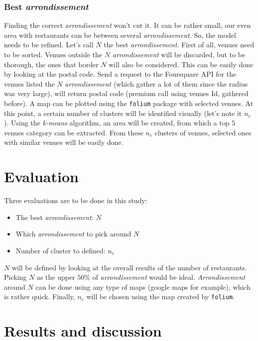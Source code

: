 \documentclass[english]{article}
\begin{document}
	\subsubsection{Best \textit{arrondissement}}
	Finding the correct \textit{arrondissement} won't cut it. It can be rather small, our even area with restaurants can be between several \textit{arrondissement}. So, the model needs to be refined. Let's call $N$ the best \textit{arrondissement}. First of all, venues need to be sorted. Venues outside the $N$ \textit{arrondissement} will be discarded, but to be thorough, the ones that border $N$ will also be considered. This can be easily done by looking at the postal code. Send a request to the Foursquare API for the venues listed the $N$ \textit{arrondissement} (which gather a lot of them since the radius was very large), will return postal code (premium call using venues Id, gathered before). A map can be plotted using the \texttt{folium} package with selected venues. At this point, a certain number of clusters will be identified visually (let's note it $n_c$). Using the \textit{k-means} algorithm, an area will be created, from which a top $5$ venues category can be extracted. From these $n_c$ clusters of venues, selected ones with similar venues will be easily done.
	\section{Evaluation}
	Three evaluations are to be done in this study:
	\begin{itemize}
		\item The best \textit{arrondissement}: $N$
		\item Which \textit{arrondissement} to pick around $N$
		\item Number of cluster to defined: $n_c$
	\end{itemize}
	$N$ will be defined by looking at the overall results of the number of restaurants. Picking $N$ as the upper $50\%$ of \textit{arrondissement} would be ideal. \textit{Arrondissement} around $N$ can be done using any type of maps (google maps for example), which is rather quick. Finally, $n_c$ will be chosen using the map created by \texttt{folium}.
	\section{Results and discussion}
\end{document}
